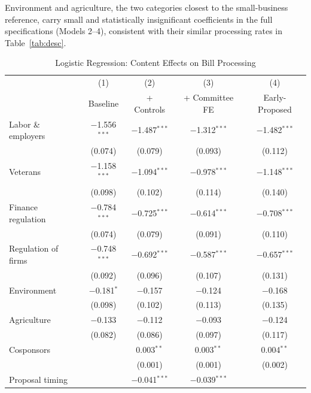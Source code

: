 \documentclass[11pt]{article}
\begin{document}
Environment and agriculture, the two categories closest to the small-business reference, carry small and statistically insignificant coefficients in the full specifications (Models 2--4), consistent with their similar processing rates in Table~\ref{tab:desc}.

\begin{table}[htbp]
\centering
\begin{threeparttable}
\caption{Logistic Regression: Content Effects on Bill Processing}
\label{tab:logit}
\begin{tabular}{lcccc}
\toprule
& (1) & (2) & (3) & (4) \\
& Baseline & + Controls & + Committee FE & Early-Proposed \\
\midrule
Labor \& employers      & $-$1.556$^{***}$ & $-$1.487$^{***}$ & $-$1.312$^{***}$ & $-$1.482$^{***}$ \\
                         & (0.074) & (0.079) & (0.093) & (0.112) \\[3pt]
Veterans                 & $-$1.158$^{***}$ & $-$1.094$^{***}$ & $-$0.978$^{***}$ & $-$1.148$^{***}$ \\
                         & (0.098) & (0.102) & (0.114) & (0.140) \\[3pt]
Finance regulation       & $-$0.784$^{***}$ & $-$0.725$^{***}$ & $-$0.614$^{***}$ & $-$0.708$^{***}$ \\
                         & (0.074) & (0.079) & (0.091) & (0.110) \\[3pt]
Regulation of firms      & $-$0.748$^{***}$ & $-$0.692$^{***}$ & $-$0.587$^{***}$ & $-$0.657$^{***}$ \\
                         & (0.092) & (0.096) & (0.107) & (0.131) \\[3pt]
Environment              & $-$0.181$^{*}$   & $-$0.157         & $-$0.124         & $-$0.168 \\
                         & (0.098) & (0.102) & (0.113) & (0.135) \\[3pt]
Agriculture              & $-$0.133         & $-$0.112         & $-$0.093         & $-$0.124 \\
                         & (0.082) & (0.086) & (0.097) & (0.117) \\[6pt]
Cosponsors               &         & 0.003$^{**}$ & 0.003$^{**}$ & 0.004$^{**}$ \\
                         &         & (0.001) & (0.001) & (0.002) \\[3pt]
Proposal timing          &         & $-$0.041$^{***}$ & $-$0.039$^{***}$ & \\

\end{tabular}
\end{threeparttable}
\end{table}
\end{document}
